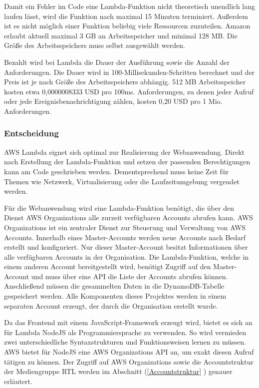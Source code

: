 {Damit ein Fehler im Code eine Lambda-Funktion nicht theoretisch unendlich lang laufen lässt, wird die Funktion nach maximal 15 Minuten terminiert.
Außerdem ist es nicht möglich einer Funktion beliebig viele Ressourcen zuzuteilen.
Amazon erlaubt aktuell maximal 3 GB an Arbeitsspeicher und minimal 128 MB.
Die Größe des Arbeitsspeichers muss selbst ausgewählt werden.

Bezahlt wird bei Lambda die Dauer der Ausführung sowie die Anzahl der Anforderungen.
Die Dauer wird in 100-Millisekunden-Schritten berechnet und der Preis ist je nach Größe des Arbeitsspeichers abhängig.
512 MB Arbeitsspeicher kosten etwa 0,0000008333 USD pro 100ms.
Anforderungen, zu denen jeder Aufruf oder jede Ereignisbenachrichtigung zählen, kosten 0,20 USD pro 1 Mio. Anforderungen.\cite[]{LambdaPreise}

\subsubsection{Entscheidung}
\label{LambdaEntscheidung}
AWS Lambda eignet sich optimal zur Realisierung der Webanwendung.
Direkt nach Erstellung der Lambda-Funktion und setzen der passenden Berechtigungen kann am Code geschrieben werden.
Dementsprechend muss keine Zeit für Themen wie Netzwerk, Virtualisierung oder die Laufzeitumgebung vergeudet werden.

Für die Webanwendung wird eine Lambda-Funktion benötigt, die über den Dienst AWS Organizations alle zurzeit verfügbaren Accounts abrufen kann.
AWS Organizations ist ein zentraler Dienst zur Steuerung und Verwaltung von AWS Accounts.
Innerhalb eines Master-Accounts werden neue Accounts nach Bedarf erstellt und konfiguriert.
Nur dieser Master-Account besitzt Informationen über alle verfügbaren Accounts in der Organisation.
Die Lambda-Funktion, welche in einem anderen Account bereitgestellt wird, benötigt Zugriff auf den Master-Account und muss über eine API die Liste der Accounts abrufen können.
Anschließend müssen die gesammelten Daten in die DynamoDB-Tabelle gespeichert werden.
Alle Komponenten dieses Projektes werden in einem separaten Account erzeugt, der durch die Organisation erstellt wurde.

Da das Frontend mit einem JavaScript-Framework erzeugt wird, bietet es sich an für Lambda NodeJS als Programmiersprache zu verwenden.
So wird vermieden zwei unterschiedliche Syntaxstrukturen und Funktionsweisen lernen zu müssen.
AWS bietet für NodeJS eine AWS Organizations API an, um exakt diesen Aufruf tätigen zu können.
Der Zugriff auf AWS Organizations sowie die Accountstruktur der Mediengruppe RTL werden im Abschnitt (\ref{Accountstruktur} ) genauer erläutert.
\cite[]{SDKListAccounts}

}
